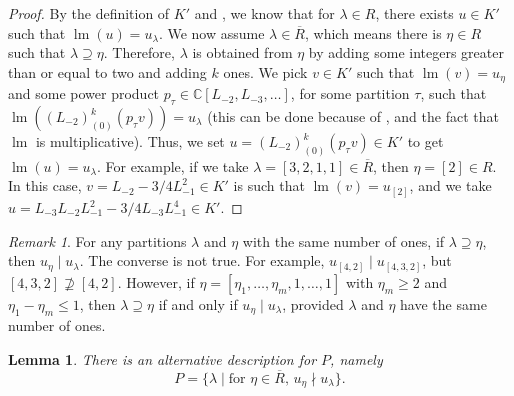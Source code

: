 \documentclass[a4paper, 12pt, reqno]{amsart}
\newtheorem{lemma}[theorem]{Lemma}
\theoremstyle{remark}
\newtheorem{remark}[theorem]{Remark}
\DeclareMathOperator{\lm}{lm}
\begin{document}
\begin{proof}
  By the definition of $K'$ and \cite[Proposition 5.1]{andrews_singular_2022}, we know that for $\lambda \in R$, there exists $u \in K'$ such that $\lm(u) = u_{\lambda}$.
  We now assume $\lambda \in \overline{R}$, which means there is $\eta \in R$ such that $\lambda \supseteq \eta$.
  Therefore, $\lambda$ is obtained from $\eta$ by adding some integers greater than or equal to two and adding $k$ ones.
  We pick $v \in K'$ such that $\lm(v) = u_{\eta}$ and some power product $p_{\tau} \in \mathbb{C}[L_{-2}, L_{-3}, \dots]$, for some partition $\tau$, such that $\lm((L_{-2})^k_{(0)}(p_{\tau}v)) = u_{\lambda}$ (this can be done because of , and the fact that $\lm$ is multiplicative).
  Thus, we set $u = (L_{-2})^k_{(0)}(p_{\tau}v) \in K'$ to get $\lm(u) = u_{\lambda}$.
  For example, if we take $\lambda = [3, 2, 1, 1] \in \overline{R}$, then $\eta = [2] \in R$.
  In this case, $v = L_{-2}- 3/4L_{-1}^2 \in K'$ is such that $\lm(v) = u_{[2]}$, and we take $u = L_{-3}L_{-2}L_{-1}^2 - 3/4L_{-3}L_{-1}^4 \in K'$.
\end{proof}

\begin{remark}
  \label{rmk:6}
  For any partitions $\lambda$ and $\eta$ with the same number of ones, if $\lambda \supseteq \eta$, then $u_{\eta} \mid u_{\lambda}$.
  The converse is not true.
  For example, $u_{[4, 2]} \mid u_{[4, 3, 2]}$, but $[4, 3, 2] \nsupseteq [4, 2]$.
  However, if $\eta = [\eta_1, \dots, \eta_m, 1, \dots, 1]$ with $\eta_m \ge 2$ and $\eta_1 - \eta_m \le 1$, then $\lambda \supseteq \eta$ if and only if $u_{\eta} \mid u_{\lambda}$, provided $\lambda$ and $\eta$ have the same number of ones.
\end{remark}

\begin{lemma}
  \label{lmm:11}
  There is an alternative description for $P$, namely
  \begin{equation*}
    P = \{\lambda \mid \text{for $\eta \in \overline{R}$, $u_{\eta} \nmid u_{\lambda}$}\}.
  \end{equation*}
\end{lemma}
\end{document}
